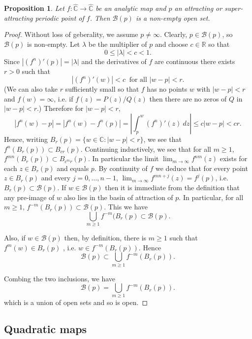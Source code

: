 \documentclass[12pt]{article}
\newtheorem{proposition}[theorem]{Proposition}
\theoremstyle{definition}
\theoremstyle{remark}
\begin{document}
\begin{proposition}
Let $f: \widehat{\mathbb{C}}   \to \widehat{\mathbb{C}}  $ be an analytic map and $p$ an attracting or super-attracting periodic point of $f$. Then $\mathcal{B}(p)$ is a non-empty open set.
\end{proposition}

\begin{proof}
Without loss of geberality, we assume $p\ne \infty$.
Clearly, $p \in \mathcal B(p)$, so $\mathcal B(p)$ is non-empty.
Let $\lambda$ be the multiplier of $p$ and choose $c \in \mathbb{R}$ so that 
\[
0 \le |\lambda| < c <1.
\] 
Since $|(f^n)'(p)| = |\lambda|$ and the derivatives of $f$ are continuous there exists $r > 0$ such that
\[
|(f^n)'(w)| < c \ \text{ for all } |w- p| < r.
\]
(We can also take $r$ sufficiently small so that $f$ has no points $w$ with $|w - p| < r$ and $f(w) = \infty$, i.e. if $f(z) = P(z)/Q(z)$ then there are no zeros of $Q$ in $|w-p| < r$.)
Therefore for $|w - p| < r$, 
\[
|f^n(w) - p| = |f^n(w) - f^n(p)| = \left| \int_p^w (f^n)'(z) \ dz \right| \le c|w -p| < cr.
\]
Hence, writing $B_r(p) = \{ w \in \mathbb{C} : |w - p| < r\}$, we see that $f^n(B_r(p)) \subset B_{cr}(p)$.
Continuing inductively, we see that for all $m \ge 1$,
$f^{mn}(B_r(p)) \subset B_{c^mr}(p)$.
In particular the limit $\lim_{m\to\infty} f^{nm}(z)$ exists for each $z \in B_r(p)$ and equals $p$. 
By continuity of $f$ we deduce that for every point $z \in B_r(p)$ 
and every $j=0,\ldots,n-1$,
$\lim_{m\to\infty} f^{mn+j}(z)=f^j(p)$,
i.e. $B_r(p) \subset \mathcal{B}(p)$.
If $w \in \mathcal B(p)$ then it is immediate from the definition that any pre-image of $w$ also lies in 
the basin of attraction of $p$. In particular, for all $m \ge 1$,
$f^{-m}(B_r(p)) \subset \mathcal{B}(p)$. This we have
\[
 \bigcup_{m \ge 1} f^{-m}(B_r(p) \subset \mathcal{B}(p).
\]






Also, if $w\in \mathcal{B}(p)$ then, by definition, there is $m \ge 1$ such that $f^m(w) \in B_r(p)$ ,
i.e. $w \in f^{-m}(B_r(p))$. Hence
\[
\mathcal{B}(p) \subset \bigcup_{m \ge 1} f^{-m}(B_r(p)).
\]

Combing the two inclusions, we have 
\[
\mathcal{B}(p) = \bigcup_{m \ge 1} f^{-m}(B_r(p)).
\]
which is a union of open sets and so is open. 
\end{proof}




\subsection{Quadratic maps}
\end{document}
